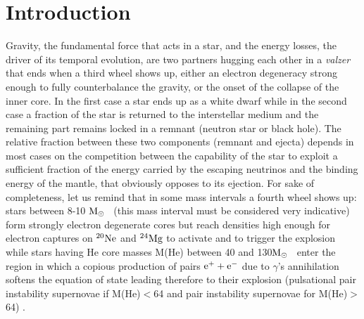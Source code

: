 \documentclass{aastex631}
\newcommand{\msun}{$\rm M_\odot$}
\newcommand\nuk[2]{$\rm ^{\rm #2} #1$}
\begin{document}
\section{Introduction} \label{sec:intro}
Gravity, the fundamental force that acts in a star, and the energy losses, the driver of its temporal evolution, are two partners hugging each other in a {\it valzer} that ends when a third wheel shows up, either an electron degeneracy strong enough to fully counterbalance the gravity, or the onset of the collapse of the inner core. In the first case a star ends up as a white dwarf while in the second case a fraction of the star is returned to the interstellar medium and the remaining part remains locked in a remnant (neutron star or black hole). The relative fraction between these two components (remnant and ejecta) depends in most cases on the competition between the capability of the star to exploit a sufficient fraction of the energy carried by the escaping neutrinos and the binding energy of the mantle, that obviously opposes to its ejection. For sake of completeness, let us remind that in some mass intervals a fourth wheel shows up: stars between 8-10 \msun~ (this mass interval must be considered very indicative) form strongly electron degenerate cores but reach densities high enough for electron captures on \nuk{Ne}{20} and \nuk{Mg}{24} \citep{mi80,no84} to activate and to trigger the explosion while stars having He core masses M(He) between 40 and 130\msun~ enter the region in which a copious production of pairs $\rm e^++e^-$ due to $\gamma$'s annihilation softens the equation of state leading therefore to their explosion (pulsational pair instability supernovae if M(He)$<$64 and pair instability supernovae for M(He)$>$64) \citep{hw02}.
\end{document}
